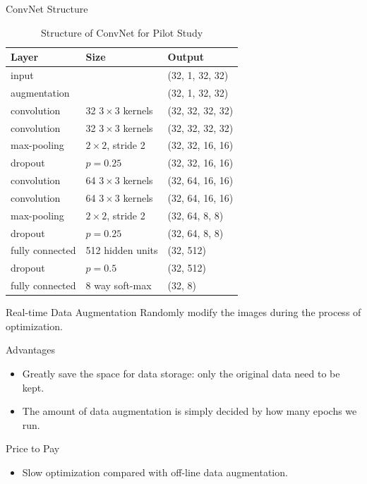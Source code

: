 \documentclass[mathserif]{beamer}
\begin{document}
\begin{frame}{ConvNet Structure}
\vspace{-20pt}
\begin{table}[ht]
\centering
\footnotesize
\rmfamily
\caption{Structure of ConvNet for Pilot Study}
\begin{tabular}{lll}
\toprule
Layer & Size & Output \\
\midrule
input & & (32, 1, 32, 32) \\
augmentation & & (32, 1, 32, 32) \\
convolution & 32 $3\times3$ kernels & (32, 32, 32, 32) \\
convolution & 32 $3\times3$ kernels & (32, 32, 32, 32) \\
max-pooling & $2 \times 2$, stride 2 & (32, 32, 16, 16) \\
dropout & $p = 0.25$ & (32, 32, 16, 16) \\
convolution & 64 $3\times3$ kernels & (32, 64, 16, 16) \\
convolution & 64 $3\times3$ kernels & (32, 64, 16, 16) \\
max-pooling & $2 \times 2$, stride 2 & (32, 64, 8, 8) \\
dropout & $p = 0.25$ & (32, 64, 8, 8) \\
fully connected & 512 hidden units & (32, 512)\\
dropout & $p = 0.5$ & (32, 512) \\
fully connected & 8 way soft-max & (32, 8)\\
\bottomrule
\end{tabular}
\end{table}
\end{frame}


\begin{frame}{Real-time Data Augmentation}
Randomly modify the images during the process of optimization.

\begin{block}{Advantages}
\begin{itemize}
\item Greatly save the space for data storage: only the original data need to be kept.
\item The amount of data augmentation is simply decided by how many epochs we run.
\end{itemize}
\end{block}
\begin{block}{Price to Pay}
\begin{itemize}
\item Slow optimization compared with off-line data augmentation.
\end{itemize}
\end{block}
\end{frame}
\end{document}
